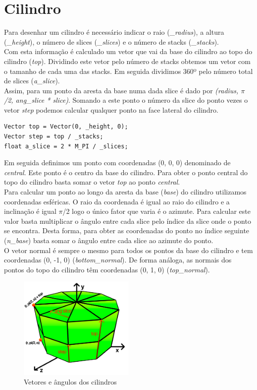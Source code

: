 \documentclass[a4paper]{report}
\begin{document}
\section{Cilindro}
Para desenhar um cilindro é necessário indicar o raio (\textit{\_radius}), a
altura (\textit{\_height}), o número de slices (\textit{\_slices}) e o número de
stacks (\textit{\_stacks}).\\
Com esta informação é calculado um vetor que vai da base do cilindro ao topo do
cilindro (\textit{top}). Dividindo este vetor pelo número de stacks obtemos um
vetor com o tamanho de cada uma das stacks. Em seguida dividimos 360º pelo
número total de slices (\textit{a\_slice}).\\
Assim, para um ponto da aresta da base numa dada slice é dado por
\textit{(radius, $\pi$/2, ang\_slice * slice)}. Somando a este ponto o número da
slice do ponto vezes o vetor \textit{step} podemos calcular qualquer ponto na
face lateral do cilindro.
\begin{lstlisting}
Vector top = Vector(0, _height, 0);
Vector step = top / _stacks;
float a_slice = 2 * M_PI / _slices;
\end{lstlisting}
Em seguida definimos um ponto com coordenadas (0, 0, 0) denominado de
\textit{central}. Este ponto é o centro da base do cilindro. Para obter o
ponto central do topo do cilindro basta somar o vetor \textit{top} ao ponto
\textit{central}.\\
Para calcular um ponto ao longo da aresta da base (\textit{base}) do cilindro
utilizamos coordenadas esféricas. O raio da coordenada é igual ao raio do
cilindro e a inclinação é igual $\pi$/2 logo o único fator que varia é o
azimute. Para calcular este valor basta multiplicar o ângulo entre cada slice
pelo índice da slice onde o ponto se encontra. Desta forma, para obter as
coordenadas do ponto no índice seguinte (\textit{n\_base}) basta somar o ângulo
entre cada slice ao azimute do ponto.\\
O vetor normal é sempre o mesmo para todos os pontos da base do
cilindro e tem coordenadas (0, -1, 0) (\textit{bottom\_normal}). De forma
análoga, as normais dos pontos do topo do cilindro têm coordenadas (0, 1, 0)
(\textit{top\_normal}).\\
\begin{figure}[H]
    \centering 
    \includegraphics[width=0.5\textwidth]{images/cilindro_vetores.png}  
    \caption{Vetores e ângulos dos cilindros}
\end{figure}
\end{document}

